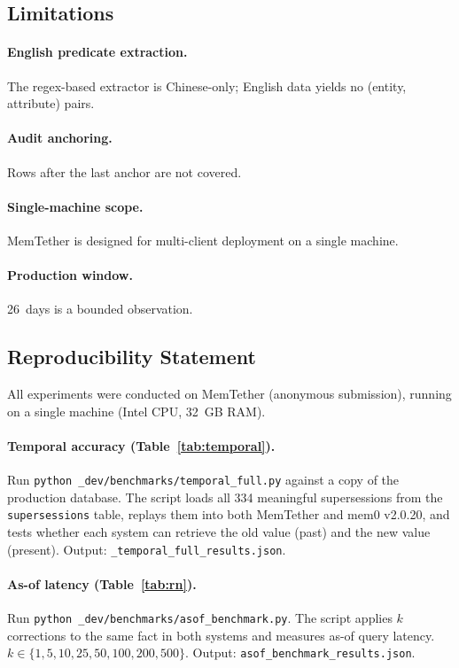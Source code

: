 \documentclass{article}
\begin{document}
\subsection{Limitations}
\paragraph{English predicate extraction.} The regex-based extractor is Chinese-only; English data yields no (entity, attribute) pairs.
\paragraph{Audit anchoring.} Rows after the last anchor are not covered.
\paragraph{Single-machine scope.} MemTether is designed for multi-client deployment on a single machine.
\paragraph{Production window.} 26~days is a bounded observation.

\subsection*{Reproducibility Statement}

All experiments were conducted on MemTether (anonymous submission), running on a single machine (Intel CPU, 32~GB RAM).

\paragraph{Temporal accuracy (Table~\ref{tab:temporal}).}
Run \texttt{python \_dev/benchmarks/temporal\_full.py} against a copy of the production database.
The script loads all 334 meaningful supersessions from the \texttt{supersessions} table,
replays them into both MemTether and mem0 v2.0.20, and tests whether each system can
retrieve the old value (past) and the new value (present).
Output: \texttt{\_temporal\_full\_results.json}.

\paragraph{As-of latency (Table~\ref{tab:rn}).}
Run \texttt{python \_dev/benchmarks/asof\_benchmark.py}.
The script applies $k$ corrections to the same fact in both systems and measures as-of query latency.
$k \in \{1, 5, 10, 25, 50, 100, 200, 500\}$. Output: \texttt{asof\_benchmark\_results.json}.
\end{document}
